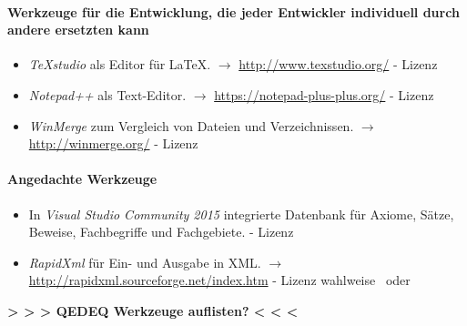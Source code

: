 \documentclass[english,ngerman,parskip=half,headsepline,footsepline]{scrreprt}
\newcounter{Enumi}
\begin{document}
	\paragraph{Werkzeuge für die Entwicklung, die jeder Entwickler individuell durch andere ersetzten kann}
	\begin{itemize}
		\setcounter{enumi}{\value{Enumi}}

		\item\label{Werkzeug:TeXstudio}\emph{\TeX studio} als Editor für \LaTeX. $\rightarrow$ \url{http://www.texstudio.org/} - Lizenz~\cite{bib:GPLii}

		\item\label{Werkzeug:Notepadpp}\emph{Notepad++} als Text-Editor. $\rightarrow$ \url{https://notepad-plus-plus.org/} - Lizenz~\cite{bib:GPLi}

		\item\label{Werkzeug:WinMerge}\emph{WinMerge} zum Vergleich von Dateien und Verzeichnissen. $\rightarrow$ \url{http://winmerge.org/} - Lizenz~\cite{bib:GPLi}

		\setcounter{Enumi}{\value{enumi}}
	\end{itemize}

	\paragraph{Angedachte Werkzeuge}
	\begin{itemize}
		\setcounter{enumi}{\value{Enumi}}

		\item\label{Werkzeug:VSC DB}In \emph{Visual Studio Community 2015} integrierte Datenbank für Axiome, Sätze, Beweise, Fachbegriffe und Fachgebiete. - Lizenz~\cite{bib:EULA}

		\item\label{Werkzeug:RapidXml}\emph{RapidXml} für Ein- und Ausgabe in XML. $\rightarrow$ \url{http://rapidxml.sourceforge.net/index.htm} - Lizenz wahlweise~\cite{bib:BSLi} oder~\cite{bib:MIT}

	\end{itemize}

	\par \textbf{> > > QEDEQ Werkzeuge auflisten? < < <} %
\end{document}
